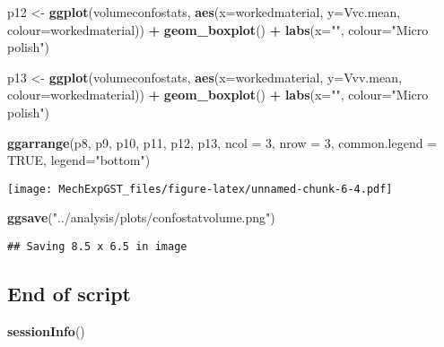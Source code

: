 \documentclass[
]{article}
\newenvironment{Shaded}{\begin{snugshade}}{\end{snugshade}}
\newcommand{\DataTypeTok}[1]{\textcolor[rgb]{0.13,0.29,0.53}{#1}}
\newcommand{\DecValTok}[1]{\textcolor[rgb]{0.00,0.00,0.81}{#1}}
\newcommand{\KeywordTok}[1]{\textcolor[rgb]{0.13,0.29,0.53}{\textbf{#1}}}
\newcommand{\NormalTok}[1]{#1}
\newcommand{\OperatorTok}[1]{\textcolor[rgb]{0.81,0.36,0.00}{\textbf{#1}}}
\newcommand{\OtherTok}[1]{\textcolor[rgb]{0.56,0.35,0.01}{#1}}
\newcommand{\StringTok}[1]{\textcolor[rgb]{0.31,0.60,0.02}{#1}}
\begin{document}
\begin{Shaded}
\begin{Highlighting}[]
\NormalTok{p12 <-}\StringTok{ }\KeywordTok{ggplot}\NormalTok{(volumeconfostats, }\KeywordTok{aes}\NormalTok{(}\DataTypeTok{x=}\NormalTok{workedmaterial, }\DataTypeTok{y=}\NormalTok{Vvc.mean, }\DataTypeTok{colour=}\NormalTok{workedmaterial)) }\OperatorTok{+}\StringTok{ }
\StringTok{  }\KeywordTok{geom_boxplot}\NormalTok{() }\OperatorTok{+}
\StringTok{  }\KeywordTok{labs}\NormalTok{(}\DataTypeTok{x=}\StringTok{""}\NormalTok{, }\DataTypeTok{colour=}\StringTok{"Micro polish"}\NormalTok{)}

\NormalTok{p13 <-}\StringTok{ }\KeywordTok{ggplot}\NormalTok{(volumeconfostats, }\KeywordTok{aes}\NormalTok{(}\DataTypeTok{x=}\NormalTok{workedmaterial, }\DataTypeTok{y=}\NormalTok{Vvv.mean, }\DataTypeTok{colour=}\NormalTok{workedmaterial)) }\OperatorTok{+}\StringTok{ }
\StringTok{  }\KeywordTok{geom_boxplot}\NormalTok{() }\OperatorTok{+}
\StringTok{  }\KeywordTok{labs}\NormalTok{(}\DataTypeTok{x=}\StringTok{""}\NormalTok{, }\DataTypeTok{colour=}\StringTok{"Micro polish"}\NormalTok{)}

\KeywordTok{ggarrange}\NormalTok{(p8, p9, p10, p11, p12, p13, }\DataTypeTok{ncol =} \DecValTok{3}\NormalTok{, }\DataTypeTok{nrow =} \DecValTok{3}\NormalTok{, }\DataTypeTok{common.legend =} \OtherTok{TRUE}\NormalTok{, }\DataTypeTok{legend=}\StringTok{"bottom"}\NormalTok{)}
\end{Highlighting}
\end{Shaded}

\texttt{[image: MechExpGST\_files/figure-latex/unnamed-chunk-6-4.pdf]}

\begin{Shaded}
\begin{Highlighting}[]
\KeywordTok{ggsave}\NormalTok{(}\StringTok{"../analysis/plots/confostatvolume.png"}\NormalTok{)}
\end{Highlighting}
\end{Shaded}

\begin{verbatim}
## Saving 8.5 x 6.5 in image
\end{verbatim}

\hypertarget{end-of-script}{%
\subsection{End of script}\label{end-of-script}}

\begin{Shaded}
\begin{Highlighting}[]
\KeywordTok{sessionInfo}\NormalTok{()}
\end{Highlighting}
\end{Shaded}
\end{document}
